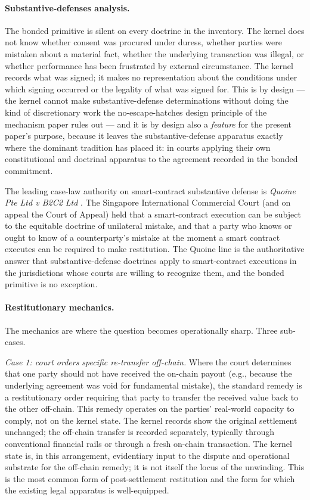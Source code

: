 \documentclass[11pt,a4paper]{article}
\theoremstyle{remark}
\begin{document}
\paragraph{Substantive-defenses analysis.}
The bonded primitive is silent on every doctrine in the inventory.
The kernel does not know whether consent was procured under
duress, whether parties were mistaken about a material fact,
whether the underlying transaction was illegal, or whether
performance has been frustrated by external circumstance. The
kernel records what was signed; it makes no representation about
the conditions under which signing occurred or the legality of
what was signed for. This is by design --- the kernel cannot make
substantive-defense determinations without doing the kind of
discretionary work the no-escape-hatches design principle of the
mechanism paper rules out --- and it is by design also a
\emph{feature} for the present paper's purpose, because it leaves
the substantive-defense apparatus exactly where the dominant
tradition has placed it: in courts applying their own
constitutional and doctrinal apparatus to the agreement
recorded in the bonded commitment.

The leading case-law authority on smart-contract substantive
defense is \emph{Quoine Pte Ltd v B2C2 Ltd}
\citep{quoine_b2c2_2019, quoine_b2c2_2020}. The Singapore
International Commercial Court (and on appeal the Court of
Appeal) held that a smart-contract execution can be subject to
the equitable doctrine of unilateral mistake, and that a party
who knows or ought to know of a counterparty's mistake at the
moment a smart contract executes can be required to make
restitution. The Quoine line is the authoritative answer that
substantive-defense doctrines apply to smart-contract executions
in the jurisdictions whose courts are willing to recognize them,
and the bonded primitive is no exception.

\paragraph{Restitutionary mechanics.}
The mechanics are where the question becomes operationally
sharp. Three sub-cases.

\emph{Case 1: court orders specific re-transfer off-chain.}
Where the court determines that one party should not have
received the on-chain payout (e.g., because the underlying
agreement was void for fundamental mistake), the standard remedy
is a restitutionary order requiring that party to transfer the
received value back to the other off-chain. This remedy operates
on the parties' real-world capacity to comply, not on the kernel
state. The kernel records show the original settlement
unchanged; the off-chain transfer is recorded separately,
typically through conventional financial rails or through a
fresh on-chain transaction. The kernel state is, in this
arrangement, evidentiary input to the dispute and operational
substrate for the off-chain remedy; it is not itself the locus
of the unwinding. This is the most common form of post-settlement
restitution and the form for which the existing legal apparatus
is well-equipped.
\end{document}
